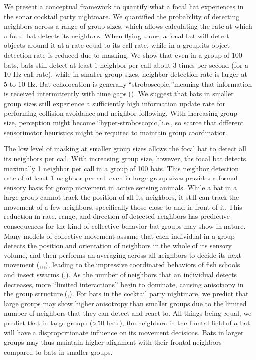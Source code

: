 \documentclass[
]{book}
\begin{document}
We present a conceptual framework to quantify what a focal bat experiences in the sonar cocktail party nightmare. We quantified the probability of detecting neighbors across a range of group sizes, which allows calculating the rate at which a focal bat detects its neighbors. When flying alone, a focal bat will detect objects around it at a rate equal to its call rate, while in a group,its object detection rate is reduced due to masking. We show that even in a group of 100 bats, bats still detect at least 1 neighbor per call about 3 times per second (for a 10 Hz call rate), while in smaller group sizes, neighbor detection rate is larger at 5 to 10 Hz. Bat echolocation is generally ``stroboscopic,''meaning that information is received intermittently with time gaps (\citet{griffin1958a}). We suggest that bats in smaller group sizes still experience a sufficiently high information update rate for performing collision avoidance and neighbor following. With increasing group size, perception might become ``hyper-stroboscopic,''i.e., so scarce that different sensorimotor heuristics might be required to maintain group coordination.

The low level of masking at smaller group sizes allows the focal bat to detect all its neighbors per call. With increasing group size, however, the focal bat detects maximally 1 neighbor per call in a group of 100 bats. This neighbor detection rate of at least 1 neighbor per call even in large group sizes provides a formal sensory basis for group movement in active sensing animals. While a bat in a large group cannot track the position of all its neighbors, it still can track the movement of a few neighbors, specifically those close to and in front of it. This reduction in rate, range, and direction of detected neighbors has predictive consequences for the kind of collective behavior bat groups may show in nature. Many models of collective movement assume that each individual in a group detects the position and orientation of neighbors in the whole of its sensory volume, and then performs an averaging across all neighbors to decide its next movement (\citet{couzin2002a},\citet{g2004a},\citet{t1995a},\citet{reynolds1987a}), leading to the impressive coordinated behaviors of fish schools and insect swarms (\citet{sumpter2006a},\citet{vicsek2012a}). As the number of neighbors that an individual detects decreases, more ``limited interactions'' begin to dominate, causing anisotropy in the group structure (\citet{bode2011a},\citet{ballerini2008a}). For bats in the cocktail party nightmare, we predict that large groups may show higher anisotropy than smaller groups due to the limited number of neighbors that they can detect and react to. All things being equal, we predict that in large groups (\textgreater50 bats), the neighbors in the frontal field of a bat will have a disproportionate influence on its movement decisions. Bats in larger groups may thus maintain higher alignment with their frontal neighbors compared to bats in smaller groups.
\end{document}
